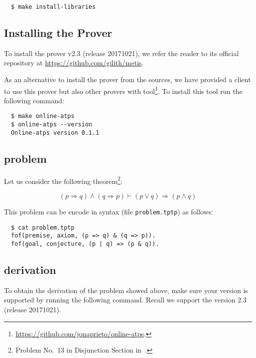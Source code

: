 \documentclass[../main.tex]{subfiles}
\begin{document}
\begin{subappendices}
\begin{verbatim}
  $ make install-libraries
\end{verbatim}

\subsection{Installing the \Metis Prover}

To install the \Metis prover v2.3 (release 20171021),
we refer the reader to its official
repository at \url{https://github.com/gilith/metis}.

As an alternative to install the prover from the \Metis sources,
we have provided a \Haskell client
to use this prover but also other provers with 
tool\footnote{\url{https://github.com/jonaprieto/online-atps}.}.
To install this tool run the following command:

\begin{verbatim}
  $ make online-atps
  $ online-atps --version
  Online-atps version 0.1.1
\end{verbatim}

\subsection{\TPTP problem}

Let us consider the following
theorem\footnote{Problem No.~13 in Disjunction Section in~\cite{Prieto-Cubides2017}.}:

\begin{equation}
\label{eq:complete-example-problem}
(p \Rightarrow q) \wedge (q \Rightarrow p) ⊢ (p \vee q) \Rightarrow (p \wedge q)
\end{equation}

This problem can be encode in \TPTP syntax (file \verb!problem.tptp!) as follows:

\begin{verbatim}
  $ cat problem.tptp
  fof(premise, axiom, (p => q) & (q => p)).
  fof(goal, conjecture, (p | q) => (p & q)).
\end{verbatim}

\subsection{\Metis derivation}

To obtain the \Metis derivation of the \TPTP problem showed above,
make sure your \Metis version is supported by running the following
command. Recall we support the version 2.3 (release 20171021).


\end{subappendices}
\end{document}

